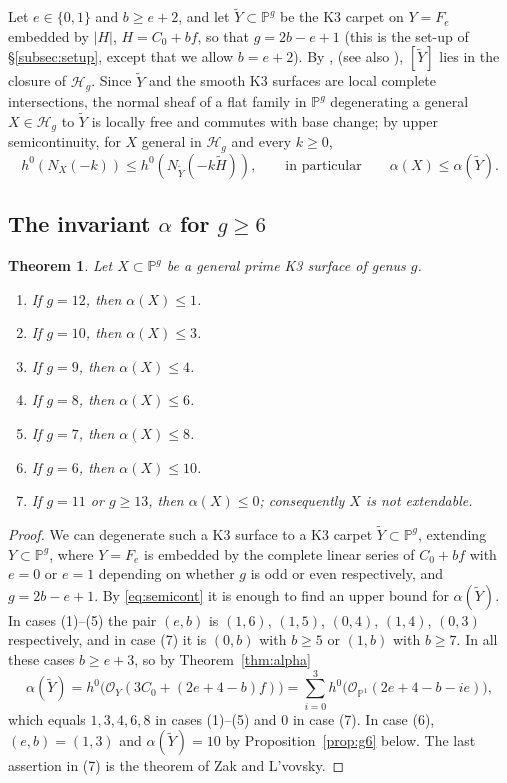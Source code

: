 \documentclass[11pt,twoside]{amsart}
\theoremstyle{plain}
\newtheorem{theorem}{Theorem}[section]
\theoremstyle{definition}
\newcommand{\PP}{\mathbb{P}}
\newcommand{\OO}{\mathcal{O}}
\newcommand{\Yt}{\widetilde{Y}}
\newcommand{\Ht}{\widetilde{H}}
\newcommand{\NYt}{N_{\Yt}}
\begin{document}
Let $e\in\{0,1\}$ and $b\ge e+2$, and let $\Yt\subset\PP^g$ be the K3 carpet on $Y=F_e$ embedded by $|H|$, $H=C_0+bf$, so that $g=2b-e+1$ (this is the set-up of \S\ref{subsec:setup}, except that we allow $b=e+2$). By , (see also \cite[Theorems~3.5 and 4.4]{GP97}), $[\Yt]$ lies in the closure of $\mathcal H_g$. Since $\Yt$ and the smooth K3 surfaces are local complete intersections, the normal sheaf of a flat family in $\PP^g$ degenerating a general $X\in\mathcal H_g$ to $\Yt$ is locally free and commutes with base change; by upper semicontinuity, for $X$ general in $\mathcal H_g$ and every $k\ge0$,
\begin{equation}\label{eq:semicont}
h^0(N_X(-k))\le h^0(\NYt(-k\Ht)),\qquad\text{in particular}\qquad \alpha(X)\le\alpha(\Yt).
\end{equation}

\subsection{The invariant \texorpdfstring{$\alpha$}{alpha} for \texorpdfstring{$g \geq 6$}{6 <= g <= 12}}

\begin{theorem}\label{thm:alpha-lowgenus}
Let $X\subset\PP^g$ be a general prime K3 surface of genus $g$.
\begin{enumerate}
\item If $g=12$, then $\alpha(X)\le1$.
\item If $g=10$, then $\alpha(X)\le3$.
\item If $g=9$, then $\alpha(X)\le4$.
\item If $g=8$, then $\alpha(X)\le6$.
\item If $g=7$, then $\alpha(X)\le8$.
\item If $g=6$, then $\alpha(X)\le10$.
\item If $g=11$ or $g\ge13$, then $\alpha(X)\le0$; consequently $X$ is not extendable.
\end{enumerate}
\end{theorem}

\begin{proof}
We can degenerate such a K3 surface to a K3 carpet $\Yt\subset\PP^g$, extending $Y\subset\PP^g$, where $Y=F_e$ is embedded by the complete linear series of $C_0+bf$ with $e=0$ or $e=1$ depending on whether $g$ is odd or even respectively, and $g=2b-e+1$. By \eqref{eq:semicont} it is enough to find an upper bound for $\alpha(\Yt)$. In cases (1)--(5) the pair $(e,b)$ is $(1,6)$, $(1,5)$, $(0,4)$, $(1,4)$, $(0,3)$ respectively, and in case (7) it is $(0,b)$ with $b\ge5$ or $(1,b)$ with $b\ge7$. In all these cases $b\ge e+3$, so by Theorem~\ref{thm:alpha}
\[
\alpha(\Yt)=h^0\big(\OO_Y(3C_0+(2e+4-b)f)\big)=\sum_{i=0}^{3}h^0\big(\OO_{\PP^1}(2e+4-b-ie)\big),
\]
which equals $1,3,4,6,8$ in cases (1)--(5) and $0$ in case (7). In case (6), $(e,b)=(1,3)$ and $\alpha(\Yt)=10$ by Proposition~\ref{prop:g6} below. The last assertion in (7) is the theorem of Zak and L'vovsky.
\end{proof}
\end{document}
